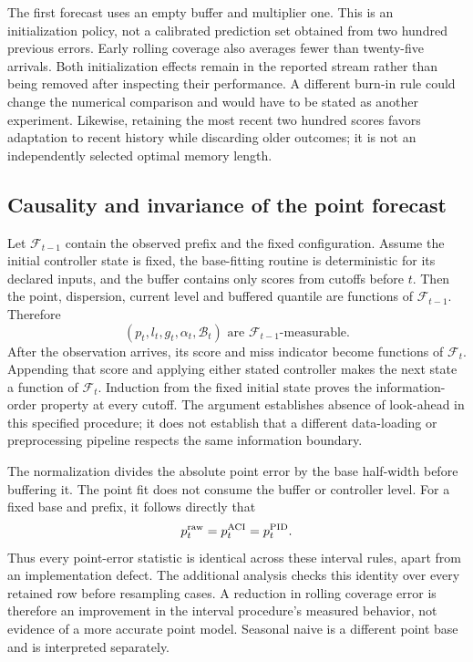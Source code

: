 The first forecast uses an empty buffer and multiplier one. This is an initialization policy, not a calibrated prediction set obtained from two hundred previous errors. Early rolling coverage also averages fewer than twenty-five arrivals. Both initialization effects remain in the reported stream rather than being removed after inspecting their performance. A different burn-in rule could change the numerical comparison and would have to be stated as another experiment. Likewise, retaining the most recent two hundred scores favors adaptation to recent history while discarding older outcomes; it is not an independently selected optimal memory length.

\subsection{Causality and invariance of the point forecast}
Let $\mathcal F_{t-1}$ contain the observed prefix and the fixed configuration. Assume the initial controller state is fixed, the base-fitting routine is deterministic for its declared inputs, and the buffer contains only scores from cutoffs before $t$. Then the point, dispersion, current level and buffered quantile are functions of $\mathcal F_{t-1}$. Therefore
\begin{equation}\label{eq:replay-causal}
 (p_t,l_t,g_t,\alpha_t,\mathcal B_t)\text{ are }\mathcal F_{t-1}\text{-measurable}.
\end{equation}
After the observation arrives, its score and miss indicator become functions of $\mathcal F_t$. Appending that score and applying either stated controller makes the next state a function of $\mathcal F_t$. Induction from the fixed initial state proves the information-order property at every cutoff. The argument establishes absence of look-ahead in this specified procedure; it does not establish that a different data-loading or preprocessing pipeline respects the same information boundary.

The normalization divides the absolute point error by the base half-width before buffering it. The point fit does not consume the buffer or controller level. For a fixed base and prefix, it follows directly that
\begin{equation}\label{eq:replay-point-identity}
 p_t^{\rm raw}=p_t^{\rm ACI}=p_t^{\rm PID}.
\end{equation}
Thus every point-error statistic is identical across these interval rules, apart from an implementation defect. The additional analysis checks this identity over every retained row before resampling cases. A reduction in rolling coverage error is therefore an improvement in the interval procedure's measured behavior, not evidence of a more accurate point model. Seasonal naive is a different point base and is interpreted separately.


